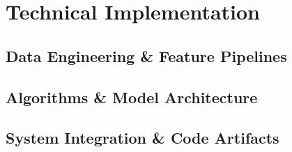 \chapter{Technical Implementation}
\label{chap:implementation}

\section{Data Engineering \& Feature Pipelines}

\section{Algorithms \& Model Architecture}

\section{System Integration \& Code Artifacts}
